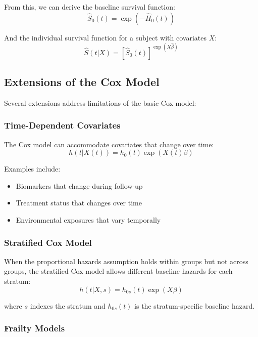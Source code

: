 From this, we can derive the baseline survival function:
\begin{equation}
    \hat{S}_0(t) = \exp(-\hat{H}_0(t))
\end{equation}

And the individual survival function for a subject with covariates $X$:
\begin{equation}
    \hat{S}(t|X) = [\hat{S}_0(t)]^{\exp(X\hat{\beta})}
\end{equation}

\subsection{Extensions of the Cox Model}

Several extensions address limitations of the basic Cox model:

\subsubsection{Time-Dependent Covariates}

The Cox model can accommodate covariates that change over time:
\begin{equation}
    h(t|X(t)) = h_0(t) \exp(X(t)\beta)
\end{equation}

Examples include:
\begin{itemize}
    \item Biomarkers that change during follow-up
    \item Treatment status that changes over time
    \item Environmental exposures that vary temporally
\end{itemize}

\subsubsection{Stratified Cox Model}

When the proportional hazards assumption holds within groups but not across groups, the stratified Cox model allows different baseline hazards for each stratum:
\begin{equation}
    h(t|X, s) = h_{0s}(t) \exp(X\beta)
\end{equation}

where $s$ indexes the stratum and $h_{0s}(t)$ is the stratum-specific baseline hazard.

\subsubsection{Frailty Models}

